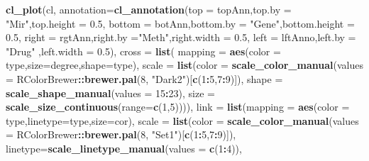 \documentclass[
]{article}
\newenvironment{Shaded}{\begin{snugshade}}{\end{snugshade}}
\newcommand{\DataTypeTok}[1]{\textcolor[rgb]{0.13,0.29,0.53}{#1}}
\newcommand{\DecValTok}[1]{\textcolor[rgb]{0.00,0.00,0.81}{#1}}
\newcommand{\FloatTok}[1]{\textcolor[rgb]{0.00,0.00,0.81}{#1}}
\newcommand{\KeywordTok}[1]{\textcolor[rgb]{0.13,0.29,0.53}{\textbf{#1}}}
\newcommand{\NormalTok}[1]{#1}
\newcommand{\OperatorTok}[1]{\textcolor[rgb]{0.81,0.36,0.00}{\textbf{#1}}}
\newcommand{\StringTok}[1]{\textcolor[rgb]{0.31,0.60,0.02}{#1}}
\begin{document}
\begin{Shaded}
\begin{Highlighting}[]
\KeywordTok{cl_plot}\NormalTok{(cl,}
       \DataTypeTok{annotation=}\KeywordTok{cl_annotation}\NormalTok{(}\DataTypeTok{top =}\NormalTok{ topAnn,}\DataTypeTok{top.by =} \StringTok{"Mir"}\NormalTok{,}\DataTypeTok{top.height =} \FloatTok{0.5}\NormalTok{,}
                                \DataTypeTok{bottom =}\NormalTok{ botAnn,}\DataTypeTok{bottom.by =} \StringTok{"Gene"}\NormalTok{,}\DataTypeTok{bottom.height =} \FloatTok{0.5}\NormalTok{,}
                                \DataTypeTok{right =}\NormalTok{ rgtAnn,}\DataTypeTok{right.by =}\StringTok{"Meth"}\NormalTok{,}\DataTypeTok{right.width =} \FloatTok{0.5}\NormalTok{,}
                                \DataTypeTok{left =}\NormalTok{ lftAnno,}\DataTypeTok{left.by =} \StringTok{"Drug"}\NormalTok{ ,}\DataTypeTok{left.width =} \FloatTok{0.5}\NormalTok{),}
       \DataTypeTok{cross =} \KeywordTok{list}\NormalTok{( }\DataTypeTok{mapping =} \KeywordTok{aes}\NormalTok{(}\DataTypeTok{color =}\NormalTok{ type,}\DataTypeTok{size=}\NormalTok{degree,}\DataTypeTok{shape=}\NormalTok{type),}
       \DataTypeTok{scale =} \KeywordTok{list}\NormalTok{(}\DataTypeTok{color =} \KeywordTok{scale_color_manual}\NormalTok{(}\DataTypeTok{values =}\NormalTok{ RColorBrewer}\OperatorTok{::}\KeywordTok{brewer.pal}\NormalTok{(}\DecValTok{8}\NormalTok{, }\StringTok{"Dark2"}\NormalTok{)[}\KeywordTok{c}\NormalTok{(}\DecValTok{1}\OperatorTok{:}\DecValTok{5}\NormalTok{,}\DecValTok{7}\OperatorTok{:}\DecValTok{9}\NormalTok{)]),}
       \DataTypeTok{shape =} \KeywordTok{scale_shape_manual}\NormalTok{(}\DataTypeTok{values =} \DecValTok{15}\OperatorTok{:}\DecValTok{23}\NormalTok{),}
       \DataTypeTok{size  =} \KeywordTok{scale_size_continuous}\NormalTok{(}\DataTypeTok{range=}\KeywordTok{c}\NormalTok{(}\DecValTok{1}\NormalTok{,}\DecValTok{5}\NormalTok{)))),}
       \DataTypeTok{link  =} \KeywordTok{list}\NormalTok{(}\DataTypeTok{mapping =} \KeywordTok{aes}\NormalTok{(}\DataTypeTok{color =}\NormalTok{ type,}\DataTypeTok{linetype=}\NormalTok{type,}\DataTypeTok{size=}\NormalTok{cor),}
                    \DataTypeTok{scale =} \KeywordTok{list}\NormalTok{(}\DataTypeTok{color =} \KeywordTok{scale_color_manual}\NormalTok{(}\DataTypeTok{values =}\NormalTok{ RColorBrewer}\OperatorTok{::}\KeywordTok{brewer.pal}\NormalTok{(}\DecValTok{8}\NormalTok{, }\StringTok{"Set1"}\NormalTok{)[}\KeywordTok{c}\NormalTok{(}\DecValTok{1}\OperatorTok{:}\DecValTok{5}\NormalTok{,}\DecValTok{7}\OperatorTok{:}\DecValTok{9}\NormalTok{)]),}
                                \DataTypeTok{linetype=}\KeywordTok{scale_linetype_manual}\NormalTok{(}\DataTypeTok{values =} \KeywordTok{c}\NormalTok{(}\DecValTok{1}\OperatorTok{:}\DecValTok{4}\NormalTok{)),}

\end{Highlighting}
\end{Shaded}
\end{document}
